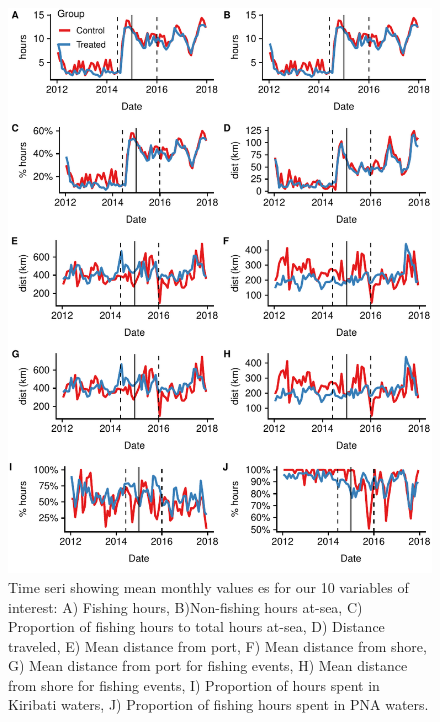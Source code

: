 \documentclass[11pt,english]{article}
\begin{document}
\begin{figure}
\centering
\includegraphics{img/all_panels.pdf}
\caption{\label{fig:all_panels}Time seri showing mean monthly values es for our 10 variables of interest:
A) Fishing hours, B)Non-fishing hours at-sea,
C) Proportion of fishing hours to total hours at-sea,
D) Distance traveled, E) Mean distance from port,
F) Mean distance from shore,
G) Mean distance from port for fishing events,
H) Mean distance from shore for fishing events,
I) Proportion of hours spent in Kiribati waters,
J) Proportion of fishing hours spent in PNA waters.}
\end{figure}

\clearpage
\begin{landscape}




\end{landscape}
\clearpage
\end{document}
